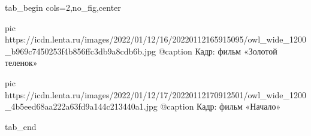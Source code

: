  
 
 
 
 


\ifcmt
  tab_begin cols=2,no_fig,center

     pic https://icdn.lenta.ru/images/2022/01/12/16/20220112165915095/owl_wide_1200_b969c7450253f4b856ffc3db9a8cdb6b.jpg
		 @caption Кадр: фильм «Золотой теленок»

		 pic https://icdn.lenta.ru/images/2022/01/12/17/20220112170912501/owl_wide_1200_4b5eed68aa222a63fd9a144c213440a1.jpg
		 @caption Кадр: фильм «Начало»

  tab_end
\fi
